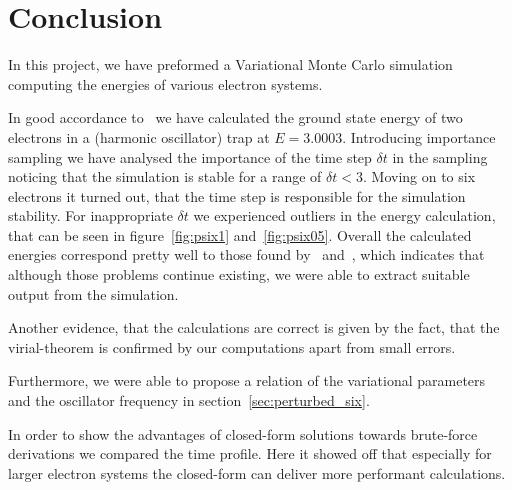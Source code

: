 \section{Conclusion}\label{sec:conclusion}
In this project, we have preformed a Variational Monte Carlo simulation computing the energies of various electron systems.

In good accordance to~\cite{hogberget2013} we have calculated the ground state energy of two electrons in a (harmonic oscillator) trap at $E=3.0003$. Introducing importance sampling we have analysed the importance of the time step $\delta t$ in the sampling noticing that the simulation is stable for a range of $\delta t < 3$. Moving on to six electrons it turned out, that the time step is responsible for the simulation stability. For inappropriate $\delta t$ we experienced outliers in the energy calculation, that can be seen in figure~\ref{fig:psix1} and~\ref{fig:psix05}. Overall the calculated energies correspond pretty well to those found by~\cite{hogberget2013} and~\cite{lohne2011}, which indicates that although those problems continue existing, we were able to extract suitable output from the simulation.

Another evidence, that the calculations are correct is given by the fact, that the virial-theorem is confirmed by our computations apart from small errors.

Furthermore, we were able to propose a relation of the variational parameters and the oscillator frequency in section~\ref{sec:perturbed_six}. 

In order to show the advantages of closed-form solutions towards brute-force derivations we compared the time profile. Here it showed off that especially for larger electron systems the closed-form can deliver more performant calculations. 